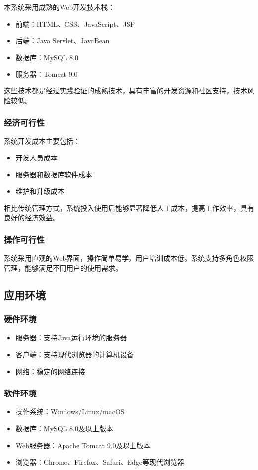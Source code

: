 \documentclass{zjut-report}
\begin{document}
本系统采用成熟的Web开发技术栈：
\begin{itemize}
\item 前端：HTML、CSS、JavaScript、JSP
\item 后端：Java Servlet、JavaBean
\item 数据库：MySQL 8.0
\item 服务器：Tomcat 9.0
\end{itemize}

这些技术都是经过实践验证的成熟技术，具有丰富的开发资源和社区支持，技术风险较低。

\subsubsection{经济可行性}

系统开发成本主要包括：
\begin{itemize}
\item 开发人员成本
\item 服务器和数据库软件成本
\item 维护和升级成本
\end{itemize}

相比传统管理方式，系统投入使用后能够显著降低人工成本，提高工作效率，具有良好的经济效益。

\subsubsection{操作可行性}

系统采用直观的Web界面，操作简单易学，用户培训成本低。系统支持多角色权限管理，能够满足不同用户的使用需求。

\subsection{应用环境}

\subsubsection{硬件环境}
\begin{itemize}
\item 服务器：支持Java运行环境的服务器
\item 客户端：支持现代浏览器的计算机设备
\item 网络：稳定的网络连接
\end{itemize}

\subsubsection{软件环境}
\begin{itemize}
\item 操作系统：Windows/Linux/macOS
\item 数据库：MySQL 8.0及以上版本
\item Web服务器：Apache Tomcat 9.0及以上版本
\item 浏览器：Chrome、Firefox、Safari、Edge等现代浏览器
\end{itemize}
\end{document}
